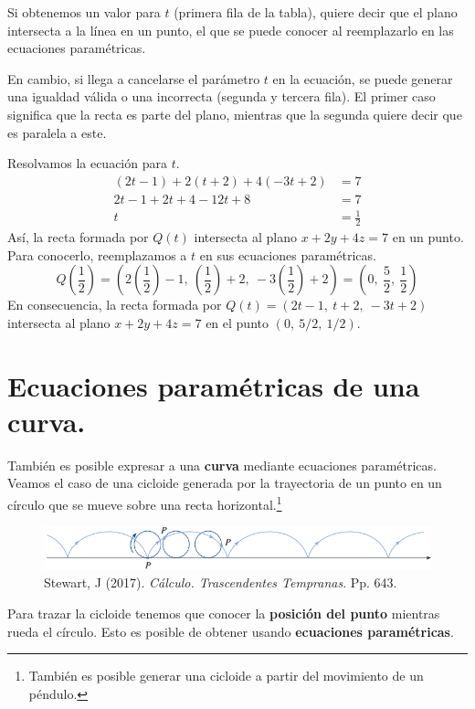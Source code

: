 \documentclass[12pt]{article}
\begin{document}
Si obtenemos un valor para $t$ (primera fila de la tabla), quiere decir que el plano intersecta a la línea en un punto, el que se puede conocer al reemplazarlo en las ecuaciones paramétricas.

En cambio, si llega a cancelarse el parámetro $t$ en la ecuación, se puede generar una igualdad válida o una incorrecta (segunda y tercera fila). El primer caso significa que la recta es parte del plano, mientras que la segunda quiere decir que es paralela a este.

Resolvamos la ecuación para $t$.
\begin{align*}
  (2t - 1) + 2(t + 2) + 4(-3t + 2) &= 7 \\
         2t - 1 + 2t + 4 - 12t + 8 &= 7 \\
                                 t &= \frac{1}{2}
\end{align*}
Así, la recta formada por $Q(t)$ intersecta al plano $x + 2y + 4z = 7$ en un punto. Para conocerlo, reemplazamos a $t$ en sus ecuaciones paramétricas.
\[
  Q\left(\frac{1}{2}\right) = \left(2\left(\frac{1}{2}\right) - 1, \ \left(\frac{1}{2}\right) + 2, \ -3\left(\frac{1}{2}\right) + 2\right)
                            = \left(0, \ \frac{5}{2}, \ \frac{1}{2}\right)
\]
En consecuencia, la recta formada por $Q(t) = (2t - 1, \ t + 2, \ -3t + 2)$ intersecta al plano $x + 2y + 4z = 7$ en el punto $(0, \ 5/2, \ 1/2)$.


\section{Ecuaciones paramétricas de una curva.}

También es posible expresar a una \textbf{curva} mediante ecuaciones paramétricas. Veamos el caso de una cicloide generada por la trayectoria de un punto en un círculo que se mueve sobre una recta horizontal.\footnote{También es posible generar una cicloide a partir del movimiento de un péndulo.}

\begin{figure}[hbt!]
\centering
\includegraphics[scale=0.7]{cicloide.png}
\caption{Stewart, J (2017). \textit{Cálculo. Trascendentes Tempranas}. Pp. 643.}
\end{figure}

Para trazar la cicloide tenemos que conocer la \textbf{posición del punto} mientras rueda el círculo. Esto es posible de obtener usando \textbf{ecuaciones paramétricas}.
\end{document}
